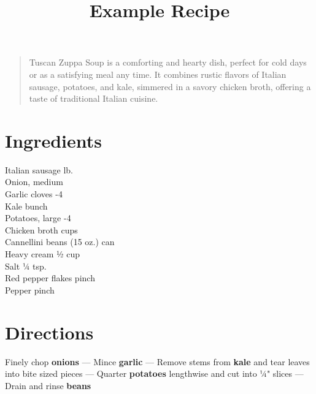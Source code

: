 \documentclass[11pt,letterpaper]{article}
\title{Example Recipe}
\author{}
\date{}
\begin{document}
\maketitle
\thispagestyle{empty}

\begin{quote}
\small
\begin{em}
Tuscan Zuppa Soup is a comforting and hearty dish, perfect for cold days or as a satisfying meal any time. It combines rustic flavors of Italian sausage, potatoes, and kale, simmered in a savory chicken broth, offering a taste of traditional Italian cuisine.
\end{em}
\end{quote}

\section*{Ingredients}
\setlength{\columnsep}{20pt}
\begin{multicols}{2}
\noindent
    Italian sausage  lb. \\
    Onion, medium  \\
    Garlic cloves -4 \\
    Kale  bunch \\
    Potatoes, large -4 \\
    \columnbreak
    Chicken broth  cups \\
    Cannellini beans  (15 oz.) can \\
    Heavy cream \dotfill ½ cup \\
    Salt \dotfill ¼ tsp. \\
    Red pepper flakes \dotfill pinch \\
    Pepper \dotfill pinch \\
\end{multicols}

\section*{Directions}

\noindent
Finely chop \textbf{onions} ---
Mince \textbf{garlic} ---
Remove stems from \textbf{kale} and tear leaves into bite sized pieces ---
Quarter \textbf{potatoes} lengthwise and cut into ¼" slices ---
Drain and rinse \textbf{beans}
\end{document}
